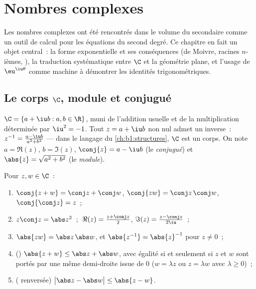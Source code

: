 \chapter{Nombres complexes}\label{ch:b1:complex}

Les nombres complexes ont été rencontrés dans le volume du secondaire
comme un outil de calcul pour les équations du second degré.
Ce chapitre en fait un objet central~: la forme exponentielle et ses
conséquences (de Moivre, racines $n$-ièmes, ), la
traduction systématique entre $\C$ et la géométrie plane, et l'usage
de $\eu^{\iu\theta}$ comme machine à démontrer les identités
trigonométriques.

\section{Le corps $\C$, module et conjugué}

\begin{definition}\label{def:b1:complex:field}
$\C = \{a + \iu b : a, b \in \R\}$, muni de l'addition usuelle et de
la multiplication déterminée par $\iu^2 = -1$. Tout $z = a + \iu b$
non nul admet un inverse~: $z^{-1} = \frac{a - \iu b}{a^2 + b^2}$ ---
dans le langage du \cref{ch:b1:structures}, $\C$ est un corps. On
note $a = \Re(z)$, $b = \Im(z)$, $\conj{z} = a - \iu b$ (le
\emph{conjugué}) et $\abs{z} = \sqrt{a^2 + b^2}$ (le
\emph{module}).
\end{definition}

\begin{proposition}\label{prop:b1:complex:rules}
Pour $z, w \in \C$~:
\begin{enumerate}
  \item $\conj{z + w} = \conj z + \conj w$, $\conj{zw} = \conj z\,
        \conj w$, $\conj{\conj z} = z$~;
  \item $z \conj z = \abs z^2$~; $\;\Re(z) = \frac{z + \conj z}{2}$,
        $\Im(z) = \frac{z - \conj z}{2\iu}$~;
  \item $\abs{zw} = \abs z\, \abs w$, et $\abs{z^{-1}} =
        \abs{z}^{-1}$ pour $z \neq 0$~;
  \item ()
        $\abs{z + w} \leq \abs z + \abs w$, avec égalité si et
        seulement si $z$ et $w$ sont portés par une même demi-droite
        issue de $0$ ($w = \lambda z$ ou $z = \lambda w$ avec
        $\lambda \geq 0$)~;
  \item ( renversée) $\bigl|\abs z - \abs w\bigr|
        \leq \abs{z - w}$.
\end{enumerate}
\end{proposition}

